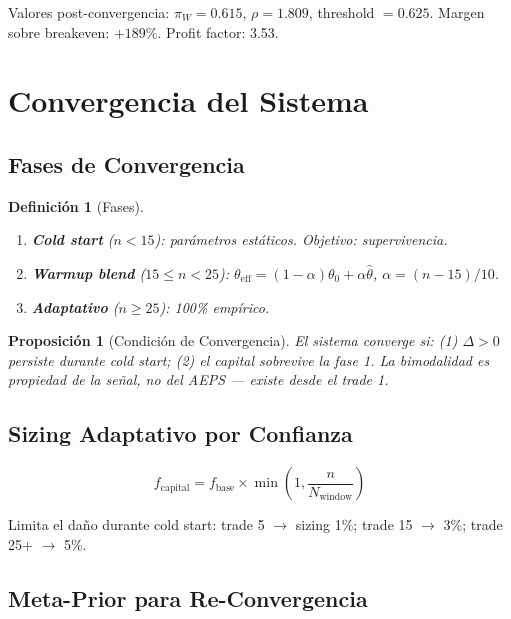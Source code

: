\documentclass[11pt,a4paper]{article}
\newtheorem{definition}{Definici\'on}[section]
\newtheorem{proposition}{Proposici\'on}[section]
\begin{document}
Valores post-convergencia: $\pi_W = 0.615$, $\rho = 1.809$,
threshold $= 0.625$. Margen sobre breakeven: $+189\%$.
Profit factor: 3.53.


\section{Convergencia del Sistema}
\label{sec:convergence}

\subsection{Fases de Convergencia}

\begin{definition}[Fases]
\begin{enumerate}[leftmargin=1.5em]
\item \textbf{Cold start} ($n < 15$): par\'ametros est\'aticos.
  Objetivo: supervivencia.
\item \textbf{Warmup blend} ($15 \leq n < 25$):
  $\theta_{\text{eff}} = (1-\alpha)\theta_0 + \alpha\hat\theta$,
  $\alpha = (n-15)/10$.
\item \textbf{Adaptativo} ($n \geq 25$): 100\% emp\'irico.
\end{enumerate}
\end{definition}

\begin{proposition}[Condici\'on de Convergencia]
El sistema converge si: (1) $\Delta > 0$ persiste durante cold start;
(2) el capital sobrevive la fase 1. La bimodalidad es propiedad de la
se\~nal, no del AEPS --- existe desde el trade 1.
\end{proposition}


\subsection{Sizing Adaptativo por Confianza}

\begin{equation}
f_{\text{capital}} = f_{\text{base}} \times \min\!\left(1, \frac{n}{N_{\text{window}}}\right)
\end{equation}

Limita el da\~no durante cold start: trade 5 $\to$ sizing 1\%;
trade 15 $\to$ 3\%; trade 25+ $\to$ 5\%.


\subsection{Meta-Prior para Re-Convergencia}
\end{document}
